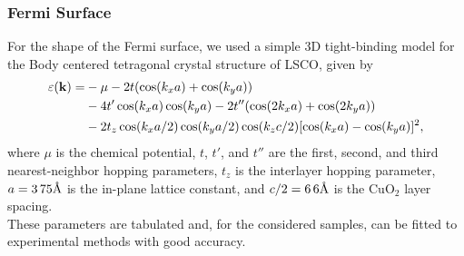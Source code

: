 \subsubsection{Fermi Surface}
For the shape of the Fermi surface, we used a simple 3D tight-binding model for the Body centered
tetragonal crystal structure of LSCO, given by
\begin{equation}
\begin{aligned}
    \varepsilon(\vb{k}) = &-\mu - 2t(\cos(k_x a) + \cos(k_y a)) \\
        &- 4t'\cos(k_x a)\cos(k_y a) - 2t''(\cos(2k_x a) + \cos(2k_y a)) \\
        &- 2t_z\cos(k_x a / 2)\cos(k_y a / 2)\cos(k_z c / 2)[\cos(k_x a) - \cos(k_y a)]^2,
\end{aligned}
\end{equation}
where $\mu$ is the chemical potential, $t$, $t'$, and $t''$ are the first, second, and third
nearest-neighbor hopping parameters, $t_z$ is the interlayer hopping parameter,
$a=\si{3.75}{\textup{\AA}}$ is the in-plane lattice constant, and $c/2=\si{6.6}{\textup{\AA}}$ is the
$\mathrm{CuO_2}$ layer spacing. \\

These parameters are tabulated and, for the considered samples, can be fitted to experimental methods with good accuracy. 
